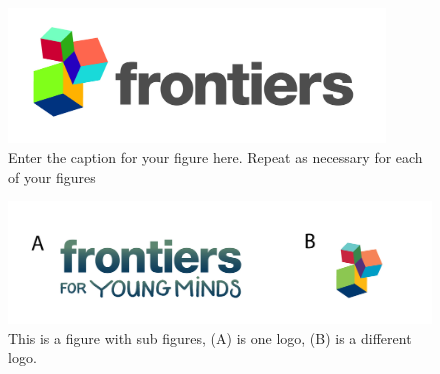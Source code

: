 \documentclass[utf8]{frontiersSCNS} %
\begin{document}

\begin{figure}[h!]
\begin{center}
\includegraphics[width=10cm]{logo1}%
\end{center}
\caption{ Enter the caption for your figure here.  Repeat as  necessary for each of your figures}\label{fig:1}
\end{figure}


\begin{figure}[h!]
\begin{center}
\includegraphics[width=15cm]{logos}
\end{center}
\caption{This is a figure with sub figures, (A) is one logo, (B) is a different logo.}\label{fig:2}
\end{figure}

\end{document}
